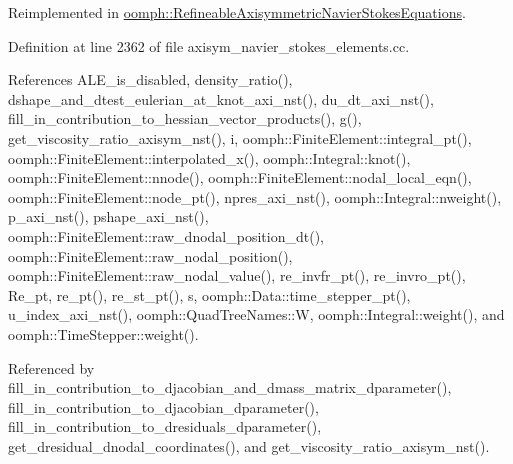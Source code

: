 Reimplemented in \hyperlink{classoomph_1_1RefineableAxisymmetricNavierStokesEquations_a649f00dc4b0e086c90ebefb5c72ee481}{oomph\+::\+Refineable\+Axisymmetric\+Navier\+Stokes\+Equations}.



Definition at line 2362 of file axisym\+\_\+navier\+\_\+stokes\+\_\+elements.\+cc.



References A\+L\+E\+\_\+is\+\_\+disabled, density\+\_\+ratio(), dshape\+\_\+and\+\_\+dtest\+\_\+eulerian\+\_\+at\+\_\+knot\+\_\+axi\+\_\+nst(), du\+\_\+dt\+\_\+axi\+\_\+nst(), fill\+\_\+in\+\_\+contribution\+\_\+to\+\_\+hessian\+\_\+vector\+\_\+products(), g(), get\+\_\+viscosity\+\_\+ratio\+\_\+axisym\+\_\+nst(), i, oomph\+::\+Finite\+Element\+::integral\+\_\+pt(), oomph\+::\+Finite\+Element\+::interpolated\+\_\+x(), oomph\+::\+Integral\+::knot(), oomph\+::\+Finite\+Element\+::nnode(), oomph\+::\+Finite\+Element\+::nodal\+\_\+local\+\_\+eqn(), oomph\+::\+Finite\+Element\+::node\+\_\+pt(), npres\+\_\+axi\+\_\+nst(), oomph\+::\+Integral\+::nweight(), p\+\_\+axi\+\_\+nst(), pshape\+\_\+axi\+\_\+nst(), oomph\+::\+Finite\+Element\+::raw\+\_\+dnodal\+\_\+position\+\_\+dt(), oomph\+::\+Finite\+Element\+::raw\+\_\+nodal\+\_\+position(), oomph\+::\+Finite\+Element\+::raw\+\_\+nodal\+\_\+value(), re\+\_\+invfr\+\_\+pt(), re\+\_\+invro\+\_\+pt(), Re\+\_\+pt, re\+\_\+pt(), re\+\_\+st\+\_\+pt(), s, oomph\+::\+Data\+::time\+\_\+stepper\+\_\+pt(), u\+\_\+index\+\_\+axi\+\_\+nst(), oomph\+::\+Quad\+Tree\+Names\+::W, oomph\+::\+Integral\+::weight(), and oomph\+::\+Time\+Stepper\+::weight().



Referenced by fill\+\_\+in\+\_\+contribution\+\_\+to\+\_\+djacobian\+\_\+and\+\_\+dmass\+\_\+matrix\+\_\+dparameter(), fill\+\_\+in\+\_\+contribution\+\_\+to\+\_\+djacobian\+\_\+dparameter(), fill\+\_\+in\+\_\+contribution\+\_\+to\+\_\+dresiduals\+\_\+dparameter(), get\+\_\+dresidual\+\_\+dnodal\+\_\+coordinates(), and get\+\_\+viscosity\+\_\+ratio\+\_\+axisym\+\_\+nst().

\mbox{\label{classoomph_1_1AxisymmetricNavierStokesEquations_a9a19729ca5b08abca8e8202614e70b29}} 
